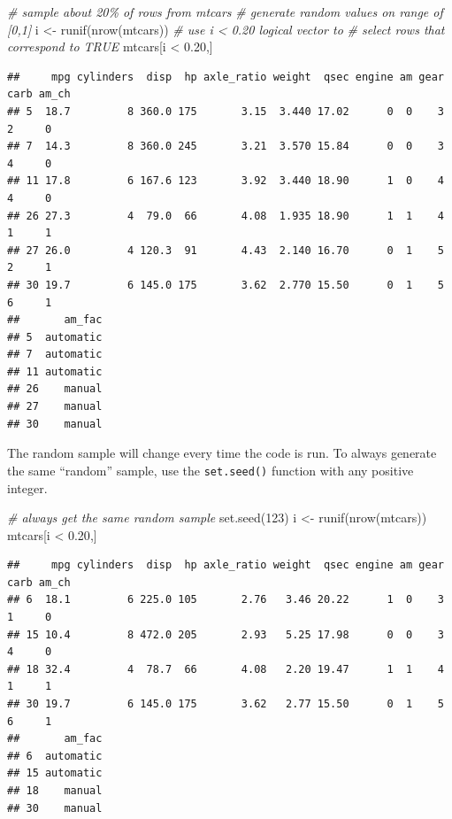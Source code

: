 \documentclass[
]{book}
\newenvironment{Shaded}{\begin{snugshade}}{\end{snugshade}}
\newcommand{\CommentTok}[1]{\textcolor[rgb]{0.56,0.35,0.01}{\textit{#1}}}
\newcommand{\DecValTok}[1]{\textcolor[rgb]{0.00,0.00,0.81}{#1}}
\newcommand{\FloatTok}[1]{\textcolor[rgb]{0.00,0.00,0.81}{#1}}
\newcommand{\FunctionTok}[1]{\textcolor[rgb]{0.00,0.00,0.00}{#1}}
\newcommand{\NormalTok}[1]{#1}
\newcommand{\OtherTok}[1]{\textcolor[rgb]{0.56,0.35,0.01}{#1}}
\newcommand{\SpecialCharTok}[1]{\textcolor[rgb]{0.00,0.00,0.00}{#1}}
\begin{document}
\begin{Shaded}
\begin{Highlighting}[]
\CommentTok{\# sample about 20\% of rows from mtcars}
\CommentTok{\# generate random values on range of [0,1]}
\NormalTok{i }\OtherTok{\textless{}{-}} \FunctionTok{runif}\NormalTok{(}\FunctionTok{nrow}\NormalTok{(mtcars))}
\CommentTok{\# use i \textless{} 0.20 logical vector to }
\CommentTok{\# select rows that correspond to TRUE}
\NormalTok{mtcars[i }\SpecialCharTok{\textless{}} \FloatTok{0.20}\NormalTok{,]}
\end{Highlighting}
\end{Shaded}

\begin{verbatim}
##     mpg cylinders  disp  hp axle_ratio weight  qsec engine am gear carb am_ch
## 5  18.7         8 360.0 175       3.15  3.440 17.02      0  0    3    2     0
## 7  14.3         8 360.0 245       3.21  3.570 15.84      0  0    3    4     0
## 11 17.8         6 167.6 123       3.92  3.440 18.90      1  0    4    4     0
## 26 27.3         4  79.0  66       4.08  1.935 18.90      1  1    4    1     1
## 27 26.0         4 120.3  91       4.43  2.140 16.70      0  1    5    2     1
## 30 19.7         6 145.0 175       3.62  2.770 15.50      0  1    5    6     1
##       am_fac
## 5  automatic
## 7  automatic
## 11 automatic
## 26    manual
## 27    manual
## 30    manual
\end{verbatim}

The random sample will change every time the code is run. To always generate the same ``random'' sample, use the \texttt{set.seed()} function with any positive integer.

\begin{Shaded}
\begin{Highlighting}[]
\CommentTok{\# always get the same random sample}
\FunctionTok{set.seed}\NormalTok{(}\DecValTok{123}\NormalTok{)}
\NormalTok{i }\OtherTok{\textless{}{-}} \FunctionTok{runif}\NormalTok{(}\FunctionTok{nrow}\NormalTok{(mtcars))}
\NormalTok{mtcars[i }\SpecialCharTok{\textless{}} \FloatTok{0.20}\NormalTok{,]}
\end{Highlighting}
\end{Shaded}

\begin{verbatim}
##     mpg cylinders  disp  hp axle_ratio weight  qsec engine am gear carb am_ch
## 6  18.1         6 225.0 105       2.76   3.46 20.22      1  0    3    1     0
## 15 10.4         8 472.0 205       2.93   5.25 17.98      0  0    3    4     0
## 18 32.4         4  78.7  66       4.08   2.20 19.47      1  1    4    1     1
## 30 19.7         6 145.0 175       3.62   2.77 15.50      0  1    5    6     1
##       am_fac
## 6  automatic
## 15 automatic
## 18    manual
## 30    manual
\end{verbatim}
\end{document}
